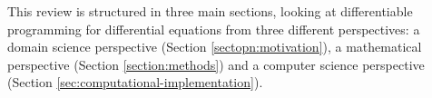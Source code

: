 This review is structured in three main sections, looking at differentiable programming for differential equations from three different perspectives: a domain science perspective (Section \ref{sectopn:motivation}), a mathematical perspective (Section \ref{section:methods}) and a computer science perspective (Section \ref{sec:computational-implementation}). 